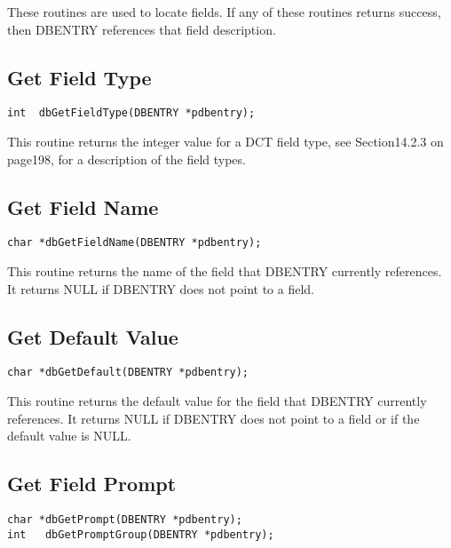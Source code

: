 These routines are used to locate fields. If any of these routines returns success, then DBENTRY references that field 
description. 

\subsection{Get Field Type}

\begin{verbatim}
int  dbGetFieldType(DBENTRY *pdbentry);
\end{verbatim}

This routine returns the integer value for a DCT field type, see Section14.2.3 on page198, for a description of the field 
types.

\subsection{Get Field Name}

\begin{verbatim}
char *dbGetFieldName(DBENTRY *pdbentry);
\end{verbatim}

This routine returns the name of the field that DBENTRY currently references. It returns NULL if DBENTRY does not 
point to a field.

\subsection{Get Default Value}

\begin{verbatim}
char *dbGetDefault(DBENTRY *pdbentry);
\end{verbatim}

This routine returns the default value for the field that DBENTRY currently references. It returns NULL if DBENTRY 
does not point to a field or if the default value is NULL.

\subsection{Get Field Prompt}

\begin{verbatim}
char *dbGetPrompt(DBENTRY *pdbentry);
int   dbGetPromptGroup(DBENTRY *pdbentry); 
\end{verbatim}

